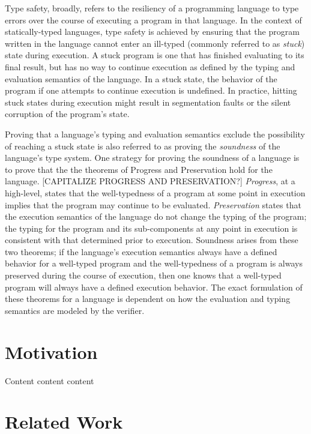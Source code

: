 \documentclass{sig-alternate}
\begin{document}
Type safety, broadly, refers to the resiliency of a programming language to type errors over the course of executing a program in that language. In the context of statically-typed languages, type safety is achieved by ensuring that the program written in the language cannot enter an ill-typed (commonly referred to as {\em stuck}) state during execution. A stuck program is one that has finished evaluating to its final result, but has no way to continue execution as defined by the typing and evaluation semantics of the language. In a stuck state, the behavior of the program if one attempts to continue execution is undefined. In practice, hitting stuck states during execution might result in segmentation faults or the silent corruption of the program's state.

Proving that a language's typing and evaluation semantics exclude the possibility of reaching a stuck state is also referred to as proving the {\em soundness} of the language's type system. One strategy for proving the soundness of a language is to prove that the the theorems of Progress and Preservation hold for the language. [CAPITALIZE PROGRESS AND PRESERVATION?] {\em Progress}, at a high-level, states that the well-typedness of a program at some point in execution implies that the program may continue to be evaluated. {\em Preservation} states that the execution semantics of the language do not change the typing of the program; the typing for the program and its sub-components at any point in execution is consistent with that determined prior to execution. Soundness arises from these two theorems; if the language's execution semantics always have a defined behavior for a well-typed program and the well-typedness of a program is always preserved during the course of execution, then one knows that a well-typed program will always have a defined execution behavior. The exact formulation of these theorems for a language is dependent on how the evaluation and typing semantics are modeled by the verifier.


\section{Motivation}
\label{sec:motivation}

Content content content

\section{Related Work}
\label{sec:related-work}
\end{document}
